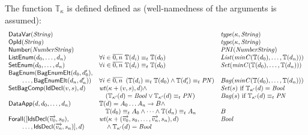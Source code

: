 \documentclass[fleqn,a4paper,dvips]{article}
\newcommand{\aterm}[1]{\mathsf{#1}}
\newcommand{\type}{\mathbb{T}}
\newcommand{\PNI}{\nm{PNI}}
\newcommand{\PN}{\nm{PN}}
\newcommand{\List}{\nm{List}}
\newcommand{\Set}{\nm{Set}}
\newcommand{\Bag}{\nm{Bag}}
\newcommand{\typecompat}{\equiv_t}
\newcommand{\wt}{\nm{wt}}
\begin{document}
{The function $\type_\kappa$ is defined defined as (well-namedness of the arguments is assumed):
\begin{displaymath}
\begin{array}{lll}
\aterm{DataVar}(\nm{String})         &                                                            & \nm{type}(\kappa,\nm{String})\\
\aterm{OpId}(\nm{String})            &                                                            & \nm{type}(\kappa,\nm{String})\\
\aterm{Number}(\nm{NumberString})    &                                                            & \PNI(\nm{NumberString})\\
\aterm{ListEnum}(d_0,\dots, d_n)     & \forall i\in\overline{0,n}~\type(d_i)\typecompat\type(d_0) & \List(\nm{minC}(\type(d_0),\dots,\type(d_n)))\\
\aterm{SetEnum}(d_0,\dots, d_n)      & \forall i\in\overline{0,n}~\type(d_i)\typecompat\type(d_0) & \Set(\nm{minC}(\type(d_0),\dots,\type(d_n)))\\ 
\aterm{BagEnum}(\aterm{BagEnumElt}(d_0,d_0'),\\
\t2\dots,\aterm{BagEnumElt}(d_n,d_n'))
                                     & \forall i\in\overline{0,n}~\left(\type(d_i)\typecompat\type(d_0)\land\type(d_i')\typecompat\PN\right) 
                                                                                                  & \Bag(\nm{minC}(\type(d_0),\dots,\type(d_n)))\\ 
\aterm{SetBagComp}(\aterm{IdDecl}(v,s),d) 
                                     & \wt(\kappa+(v,s),d)\land                                   & \Set(s)~\text{if}~\type_{\kappa'}(d)=\Bool \\
                                     &\t1(\type_{\kappa'}(d)=\Bool\lor\type_{\kappa'}(d)\typecompat\PN)               & \Bag(s)~\text{if}~\type_{\kappa'}(d)\typecompat\PN\\ 
\aterm{DataApp}(d, d_0,\dots,d_n)    & \type(d)=A_0 \dots A_n\to B\land\\
                                     & \t1\type(d_0)\typecompat A_0\land\dots\land\type(d_n)\typecompat A_n & B\\
\aterm{Forall}([\aterm{IdsDecl}(\vect{v_0},s_0),\
                                     &  \wt(\kappa+(\vect{v_0},s_0,\dots,\vect{v_n},s_n),d)       & \Bool\\
\t2\dots,\aterm{IdsDecl}(\vect{v_n},s_n)], d)
                                     & \t1\land\type_{\kappa'}(d)=\Bool                                     &\\

\end{array}
\end{displaymath}}
\end{document}
